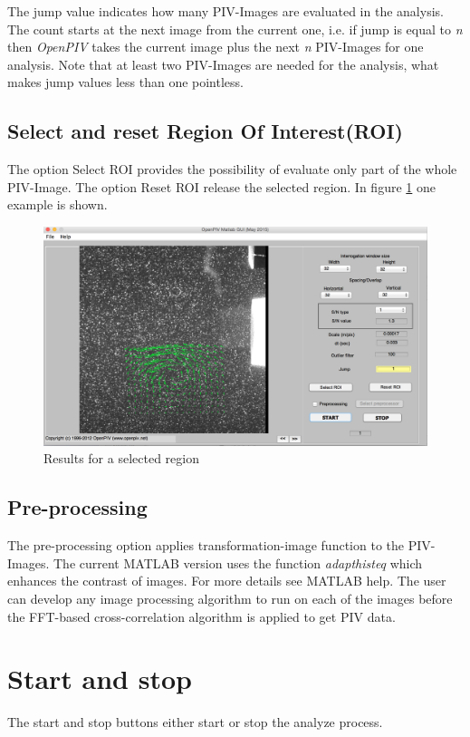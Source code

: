 The jump value indicates how many PIV-Images are evaluated in the analysis. The count starts at 
the next image from the current one, i.e. if jump is equal to \emph{n} then \emph{OpenPIV} takes 
the current image plus the next \emph{n} PIV-Images for one analysis. Note that at least two 
PIV-Images are needed for the analysis, what makes jump values less than one pointless.

\subsection{Select and reset Region Of Interest(ROI)}\label{ROI}
The option Select ROI provides the possibility of evaluate only part of the whole PIV-Image. The 
option Reset ROI release the selected region. In figure \ref{fig:ROI} one example is shown.

\begin{figure}[H]
	\centering
	\includegraphics[width=\textwidth]{Images/ROI.png}
	\caption{Results for a selected region}
	\label{fig:ROI}
\end{figure}

\subsection{Pre-processing}\label{Preprocessing}
The pre-processing option applies transformation-image function to the PIV-Images. The current  MATLAB version uses the function \emph{adapthisteq} which enhances the contrast of images.  For more details see MATLAB help. The user can develop any image processing algorithm to run on each of the images before the FFT-based cross-correlation algorithm is applied to get PIV data. 

\section{Start and stop}\label{Start}
The start and stop buttons either start or stop the analyze process.

